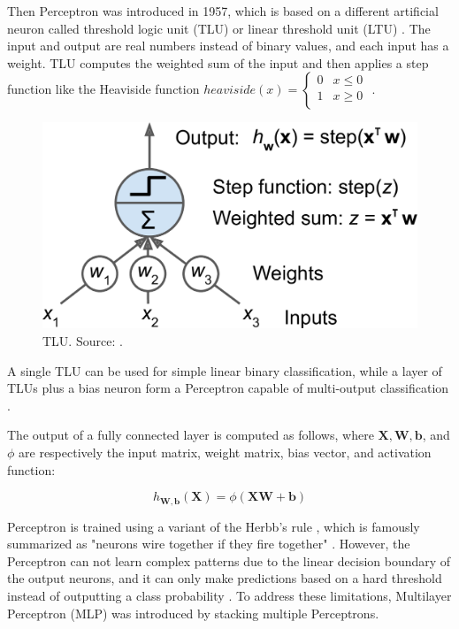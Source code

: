 \documentclass[a4paper, 11pt, oneside]{article}
\begin{document}
Then Perceptron was introduced in 1957, which is based on a different artificial neuron called threshold logic unit
(TLU) or linear threshold unit (LTU) \cite{rosenblatt1957perceptron}. The input and output are real numbers instead of
binary values, and each input has a weight. TLU computes the weighted sum of the input and then applies a step
function like the Heaviside function
$heaviside (x) =
\begin{cases}
  0 & x \le 0 \\
  1 & x \geq 0 \\
\end{cases}$
\cite{geron2019hands, rosenblatt1957perceptron}.

\begin{figure}[ht]
  \begin{center}
    \includegraphics[width=.5\textwidth]{tlu.png}
  \end{center}
  \caption{TLU. Source: \cite{geron2019hands}.}
\end{figure}

A single TLU can be used for simple linear binary classification, while a layer of TLUs plus a bias neuron form a
Perceptron capable of multi-output classification \cite{geron2019hands}.

The output of a fully connected layer is computed as follows, where $\mathbf{X}, \mathbf{W}, \mathbf{b}$, and $\phi$
are respectively the input matrix, weight matrix, bias vector, and activation function:

$$h_{\mathbf{W,b}}(\mathbf{X}) = \phi(\mathbf{XW} + \mathbf{b})$$

Perceptron is trained using a variant of the Herbb's rule \cite{hebb2005organization}, which is famously summarized
as "neurons wire together if they fire together" \cite{lowel1992selection}. However, the Perceptron
can not learn complex patterns due to the linear decision boundary of the output neurons, and it can only make predictions
based on a hard threshold instead of outputting a class probability \cite{geron2019hands}. To address these limitations,
Multilayer Perceptron (MLP) was introduced by stacking multiple Perceptrons.
\end{document}
